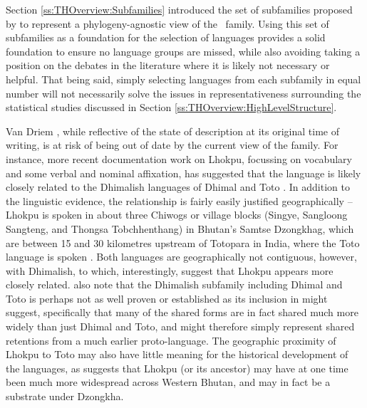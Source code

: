 Section \ref{ss:THOverview:Subfamilies} introduced the set of subfamilies proposed by  to represent a phylogeny-agnostic view of the \lfam\ family. Using this set of subfamilies as a foundation for the selection of languages provides a solid foundation to ensure no language groups are missed, while also avoiding taking a position on the debates in the literature where it is likely not necessary or helpful. That being said, simply selecting languages from each subfamily in equal number will not necessarily solve the issues in representativeness surrounding the statistical studies discussed in Section \ref{ss:THOverview:HighLevelStructure}.


Van Driem \citeyear{VanDriem2014}, while reflective of the state of description at its original time of writing, is at risk of being out of date by the current view of the family. For instance, more recent documentation work on Lhokpu, focussing on vocabulary and some verbal and nominal affixation, has suggested that the language is likely closely related to the Dhimalish languages of Dhimal and Toto \cite{Grollmann2018}. In addition to the linguistic evidence, the relationship is fairly easily justified geographically -- Lhokpu is spoken in about three Chiwogs or village blocks (Singye, Sangloong Sangteng, and Thongsa Tobchhenthang) in Bhutan's Samtse Dzongkhag, which are between 15 and 30 kilometres upstream of Totopara in India, where the Toto language is spoken \cite{Basumatary2016}. Both languages are geographically not contiguous, however, with Dhimalish, to which, interestingly,  suggest that Lhokpu appears more closely related.  also note that the Dhimalish subfamily including Dhimal and Toto is perhaps not as well proven or established as its inclusion in  might suggest, specifically that many of the shared forms are in fact shared much more widely than just Dhimal and Toto, and might therefore simply represent shared retentions from a much earlier proto-language. The geographic proximity of Lhokpu to Toto may also have little meaning for the historical development of the languages, as  suggests that Lhokpu (or its ancestor) may have at one time been much more widespread across Western Bhutan, and may in fact be a substrate under Dzongkha.

